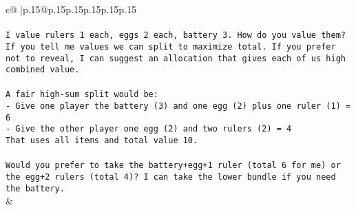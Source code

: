 \documentclass{article}
\begin{document}
{\begin{supertabular}{c@{$\;$}|p{.15\linewidth}@{}p{.15\linewidth}p{.15\linewidth}p{.15\linewidth}p{.15\linewidth}p{.15\linewidth}}
{{{\\ 
\\ 
\texttt{I value rulers 1 each, eggs 2 each, battery 3. How do you value them? If you tell me values we can split to maximize total. If you prefer not to reveal, I can suggest an allocation that gives each of us high combined value.} \\
\\ 
\texttt{A fair high{-}sum split would be:} \\
\texttt{{-} Give one player the battery (3) and one egg (2) plus one ruler (1) = 6} \\
\texttt{{-} Give the other player one egg (2) and two rulers (2) = 4} \\
\texttt{That uses all items and total value 10.} \\
\\ 
\texttt{Would you prefer to take the battery+egg+1 ruler (total 6 for me) or the egg+2 rulers (total 4)? I can take the lower bundle if you need the battery.} \\
            }
        }
    }
    & \\ \\


\end{supertabular}}
\end{document}
